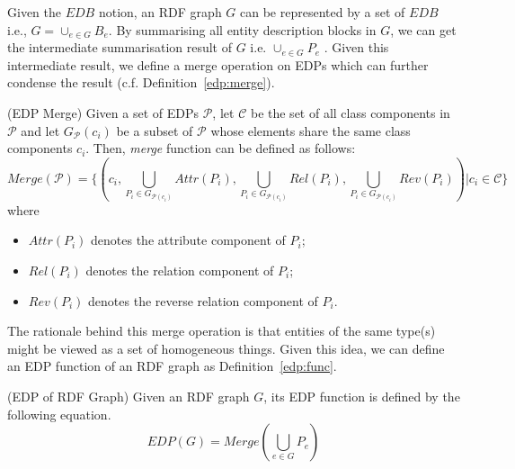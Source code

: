 Given the $EDB$ notion, an RDF graph $G$ can be represented by a set of $EDB$ i.e., $G=\cup_{e \in G}{B_e}$. By summarising all entity description blocks in $G$, we can get the intermediate summarisation result of $G$ i.e. $\cup_{e \in G}{P_e}$ . Given this intermediate result, we define a merge operation on EDPs which can further condense the result (c.f. Definition~\ref{edp:merge}).
\vspace{-1ex}
\begin{definition} 
\label{edp:merge}
(EDP Merge)  Given a set of EDPs $\mathcal{P}$, let $\mathcal{C}$ be the set of all class components in $\mathcal{P}$ and let $G_{\mathcal{P}}(c_i)$ be a subset of $\mathcal{P}$ whose elements share the same class components $c_i$. Then, \emph{merge} function can be defined as follows:
\scriptsize
\begin{equation}
Merge(\mathcal{P})=\{(c_i, \bigcup_{P_i \in G_{\mathcal{P}(c_i)}}{Attr(P_i)}, \bigcup_{P_i \in G_{\mathcal{P}(c_i)}}{Rel(P_i)}, \bigcup_{P_i \in G_{\mathcal{P}(c_i)}}{Rev(P_i)}) | c_i \in \mathcal{C} \}
\end{equation}
\normalsize
where
\begin{itemize}
\item $Attr(P_i)$ denotes the attribute component of $P_i$;
\item $Rel(P_i)$ denotes the relation component of $P_i$;
\item $Rev(P_i)$ denotes the reverse relation component of $P_i$.
\end{itemize}
\end{definition}

The rationale behind this merge operation is that entities of the same type(s) might be viewed as a set of homogeneous things. Given this idea, we can define an EDP function of an RDF graph as Definition~\ref{edp:func}.
\vspace{-1ex}
\begin{definition} 
\label{edp:func}
(EDP of RDF Graph) Given an RDF graph $G$, its EDP function is defined by the following equation.
\begin{equation}
EDP(G)=Merge(\bigcup_{e \in G}{P_e})
\end{equation}
\end{definition}

\vspace{-5ex}
